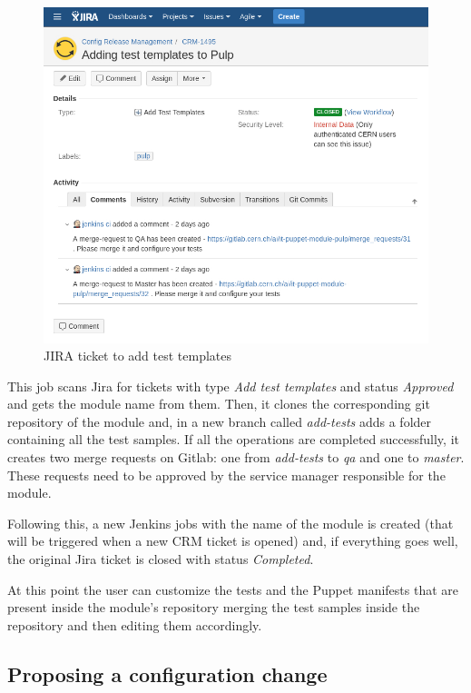 \begin{figure}[H]
\includegraphics[width=\textwidth,height=\textheight,keepaspectratio]{ContinuousIntegrationWithJenkins/images/add_test_templates.jpg}
\caption{JIRA ticket to add test templates}
\end{figure}

This job scans Jira for tickets with type \textit{Add test templates} and
status \textit{Approved} and gets the module name from them. Then, it
clones the corresponding git repository of the module and, in a new branch
called \textit{add-tests} adds a folder containing all the test samples.
If all the operations are completed successfully, it creates two merge
requests on Gitlab: one from \textit{add-tests} to \textit{qa} and one to
\textit{master}. These requests need to be approved by the service manager
responsible for the module.

Following this, a new Jenkins jobs with the name of the module is created
(that will be triggered when a new CRM ticket is opened) and, if
everything goes well, the original Jira ticket is closed with status
\textit{Completed}.

At this point the user can customize the tests and the Puppet manifests
that are present inside the module's repository merging the test samples
inside the repository and then editing them accordingly. 

\subsection{Proposing a configuration change}

